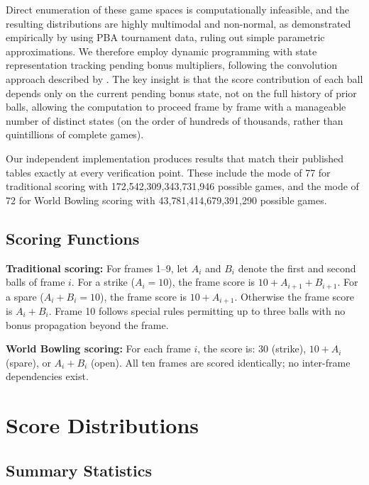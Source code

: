 \documentclass[USenglish]{article}
\theoremstyle{dgthm}
\theoremstyle{dgdef}
\begin{document}
Direct enumeration of these game spaces is computationally infeasible, and the resulting distributions are highly multimodal and non-normal, as demonstrated empirically by \citet{mccarthy2011} using PBA tournament data, ruling out simple parametric approximations. We therefore employ dynamic programming with state representation tracking pending bonus multipliers, following the convolution approach described by \citet{balmoral}. The key insight is that the score contribution of each ball depends only on the current pending bonus state, not on the full history of prior balls, allowing the computation to proceed frame by frame with a manageable number of distinct states (on the order of hundreds of thousands, rather than quintillions of complete games).

Our independent implementation produces results that match their published tables exactly at every verification point. These include the mode of 77 for traditional scoring with 172{,}542{,}309{,}343{,}731{,}946 possible games, and the mode of 72 for World Bowling scoring with 43{,}781{,}414{,}679{,}391{,}290 possible games.

\subsection{Scoring Functions}

\textbf{Traditional scoring:}
For frames 1--9, let $A_i$ and $B_i$ denote the first and second balls of frame $i$. For a strike ($A_i = 10$), the frame score is $10 + A_{i+1} + B_{i+1}$. For a spare ($A_i + B_i = 10$), the frame score is $10 + A_{i+1}$. Otherwise the frame score is $A_i + B_i$. Frame 10 follows special rules permitting up to three balls with no bonus propagation beyond the frame.

\textbf{World Bowling scoring:}
For each frame $i$, the score is: 30 (strike), $10 + A_i$ (spare), or $A_i + B_i$ (open). All ten frames are scored identically; no inter-frame dependencies exist.


\section{Score Distributions}

\subsection{Summary Statistics}
\end{document}
